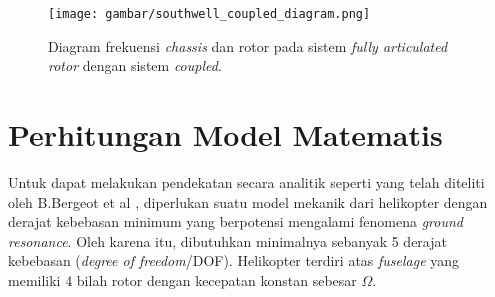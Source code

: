 \begin{figure}[H]
	\centering
	\texttt{[image: gambar/southwell\_coupled\_diagram.png]}
	\caption{Diagram frekuensi \textit{chassis} dan rotor pada sistem \textit{fully articulated rotor} dengan sistem \textit{coupled}\cite{bramwell2001bramwell}.}
	\label{fig:southwell_coupled_diagram}
\end{figure}


\section{Perhitungan Model Matematis}

Untuk dapat melakukan pendekatan secara analitik seperti yang telah diteliti oleh B.Bergeot et al \cite{BERGEOT201672}, diperlukan suatu model mekanik dari helikopter dengan derajat kebebasan minimum yang berpotensi mengalami fenomena \textit{ground resonance}. Oleh karena itu, dibutuhkan minimalnya sebanyak 5 derajat kebebasan (\textit{degree of freedom}/DOF). Helikopter terdiri atas \textit{fuselage} yang memiliki 4 bilah rotor dengan kecepatan konstan sebesar $\Omega$.

